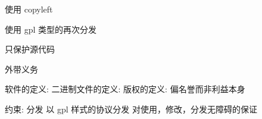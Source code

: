 






使用 copyleft

使用 gpl 类型的再次分发

只保护源代码

外带义务


软件的定义:
二进制文件的定义:
版权的定义: 偏名誉而非利益本身



约束:
  分发 以 gpl 样式的协议分发
  对使用，修改，分发无障碍的保证
  